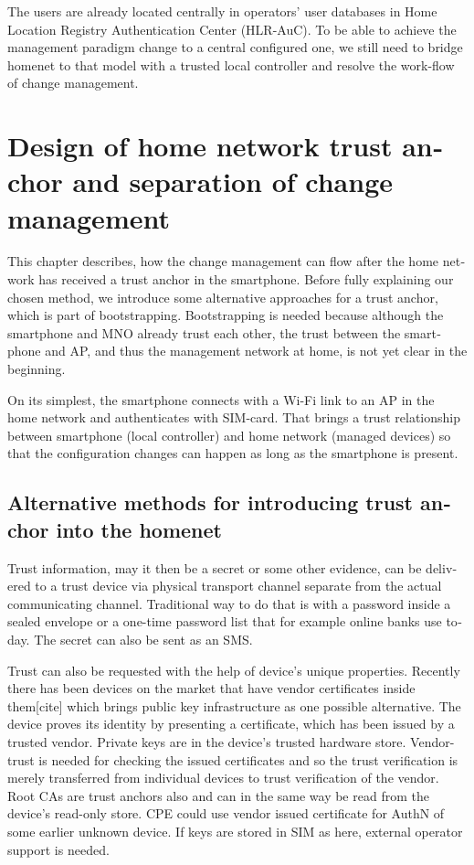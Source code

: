 \documentclass[12pt,a4paper,english]{tutthesis}
\begin{document}
\begin{otherlanguage}{english}
The users are already located centrally in operators' user databases
in Home Location Registry Authentication Center (HLR-AuC).  To be able
to achieve the management paradigm change to a central configured one,
we still need to bridge homenet to that model with a trusted local controller
and resolve the work-flow of change management.


\chapter{Design of home network trust anchor and separation of change management}
\label{sec-4}




This chapter describes, how the change management can flow after the
home network has received a trust anchor in the smartphone.  Before
fully explaining our chosen method, we introduce some alternative
approaches for a trust anchor, which is part of bootstrapping.
Bootstrapping is needed because although the smartphone and MNO
already trust each other, the trust between the smartphone and AP, and
thus the management network at home, is not yet clear in the
beginning.

On its simplest, the smartphone connects with a Wi-Fi link to an
AP in the home network and authenticates with SIM-card.
That brings a trust relationship between smartphone (local controller)
and home network (managed devices) so that the configuration changes can
happen as long as the smartphone is present.

\section{Alternative methods for introducing trust anchor into the homenet}
\label{sec-4-1}




 Trust information, may it then be a secret or some
other evidence, can be delivered to a trust device via physical
transport channel separate from the actual communicating channel.
Traditional way to do that is with a password inside a sealed
envelope or a one-time password list that for example online banks 
use today. The secret can also be sent as an SMS.

Trust can also be requested with the help of device's
unique properties. Recently there has been devices on the market that
have vendor certificates inside them[cite] which brings public key
infrastructure as one possible alternative.  The device proves its
identity by presenting a certificate, which has been issued by a
trusted vendor.  Private keys are in the device's trusted hardware
store.  Vendor-trust is needed for checking the issued certificates
and so the trust verification is merely transferred from individual
devices to trust verification of the vendor.  Root CAs are trust anchors
also and can in the same way be read from the device's read-only store.
CPE could use vendor issued certificate for AuthN of some earlier
unknown device.  If keys are stored in SIM as here, external operator
support is needed.



\end{otherlanguage}
\end{document}
